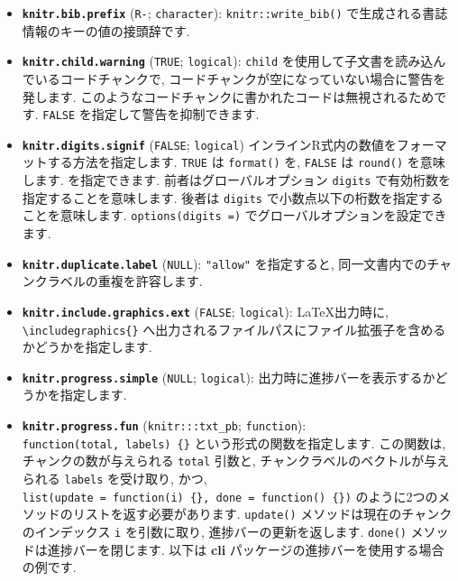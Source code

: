 \documentclass[
  lualatex,ja=standard,jafont=noto-otf]{bxjsreport}
\begin{document}
\begin{itemize}
\item
  \textbf{\texttt{knitr.bib.prefix}} (\texttt{R-}; \texttt{character}):
  \texttt{knitr::write\_bib()}
  で生成される書誌情報のキーの値の接頭辞です.
\item
  \textbf{\texttt{knitr.child.warning}} (\texttt{TRUE};
  \texttt{logical}): \texttt{child}
  を使用して子文書を読み込んでいるコードチャンクで,
  コードチャンクが空になっていない場合に警告を発します.
  このようなコードチャンクに書かれたコードは無視されるためです.
  \texttt{FALSE} を指定して警告を抑制できます.
\item
  \textbf{\texttt{knitr.digits.signif}} (\texttt{FALSE};
  \texttt{logical})
  インラインR式内の数値をフォーマットする方法を指定します. \texttt{TRUE}
  は \texttt{format()} を, \texttt{FALSE} は \texttt{round()}
  を意味します. を指定できます. 前者はグローバルオプション
  \texttt{digits} で有効桁数を指定することを意味します. 後者は
  \texttt{digits} で小数点以下の桁数を指定することを意味します.
  \texttt{options(digits\ =)} でグローバルオプションを設定できます.
\item
  \textbf{\texttt{knitr.duplicate.label}} (\texttt{NULL}):
  \texttt{"allow"} を指定すると,
  同一文書内でのチャンクラベルの重複を許容します.
\item
  \textbf{\texttt{knitr.include.graphics.ext}} (\texttt{FALSE};
  \texttt{logical}): LaTeX出力時に,
  \texttt{\textbackslash{}includegraphics\{\}}
  へ出力されるファイルパスにファイル拡張子を含めるかどうかを指定します.
\item
  \textbf{\texttt{knitr.progress.simple}} (\texttt{NULL};
  \texttt{logical}): 出力時に進捗バーを表示するかどうかを指定します.
\item
  \textbf{\texttt{knitr.progress.fun}} (\texttt{knitr:::txt\_pb};
  \texttt{function}): \texttt{function(total,\ labels)\ \{\}}
  という形式の関数を指定します. この関数は, チャンクの数が与えられる
  \texttt{total} 引数と, チャンクラベルのベクトルが与えられる
  \texttt{labels} を受け取り, かつ,
  \texttt{list(update\ =\ function(i)\ \{\},\ done\ =\ function()\ \{\})}
  のように2つのメソッドのリストを返す必要があります. \texttt{update()}
  メソッドは現在のチャンクのインデックス \texttt{i} を引数に取り,
  進捗バーの更新を返します. \texttt{done()}
  メソッドは進捗バーを閉じます. 以下は \textbf{cli}
  パッケージの進捗バーを使用する場合の例です.


\end{itemize}
\end{document}
